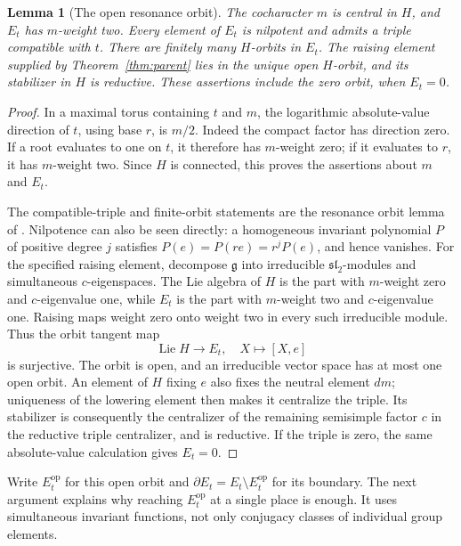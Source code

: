 \documentclass[11pt]{article}
\numberwithin{equation}{section}
\newtheorem{lemma}[theorem]{Lemma}
\theoremstyle{definition}
\theoremstyle{remark}
\newcommand{\g}{\mathfrak g}
\newcommand{\Lie}{\operatorname{Lie}}
\begin{document}
\begin{lemma}[The open resonance orbit]\label{lem:orbit-open}
The cocharacter $m$ is central in $H$, and $E_t$ has $m$-weight
two.  Every element of $E_t$ is nilpotent and admits a triple
compatible with $t$.  There are finitely many $H$-orbits in $E_t$.
The raising element supplied by Theorem~\ref{thm:parent} lies in
the unique open $H$-orbit, and its stabilizer in $H$ is reductive.
These assertions include the zero orbit, when $E_t=0$.
\end{lemma}

\begin{proof}
In a maximal torus containing $t$ and $m$, the logarithmic
absolute-value direction of $t$, using base $r$, is $m/2$.
Indeed the compact factor has direction zero.  If a root evaluates
to one on $t$, it therefore has $m$-weight zero; if it evaluates
to $r$, it has $m$-weight two.  Since $H$ is connected, this proves
the assertions about $m$ and $E_t$.

The compatible-triple and finite-orbit statements are the resonance
orbit lemma of \cite[Section~3, Lemma ``Resonance orbits'']{Parent}.
Nilpotence can also be seen directly: a homogeneous invariant
polynomial $P$ of positive degree $j$ satisfies
$P(e)=P(re)=r^jP(e)$, and hence vanishes.  For the specified raising
element, decompose $\g$ into irreducible $\mathfrak{sl}_2$-modules
and simultaneous $c$-eigenspaces.  The Lie algebra of $H$ is the
part with $m$-weight zero and $c$-eigenvalue one, while $E_t$ is
the part with $m$-weight two and $c$-eigenvalue one.  Raising maps
weight zero onto weight two in every such irreducible module.
Thus the orbit tangent map
\[
                   \Lie H\longrightarrow E_t,
                            \quad X\longmapsto[X,e]
\]
is surjective.  The orbit is open, and an irreducible vector space
has at most one open orbit.  An element of $H$ fixing $e$ also fixes
the neutral element $dm$; uniqueness of the lowering element then
makes it centralize the triple.  Its stabilizer is consequently the
centralizer of the remaining semisimple factor $c$ in the reductive
triple centralizer, and is reductive.  If the triple is zero, the
same absolute-value calculation gives $E_t=0$.
\end{proof}

Write $E_t^{\mathrm{op}}$ for this open orbit and
$\partial E_t=E_t\setminus E_t^{\mathrm{op}}$ for its boundary.
The next argument explains why reaching $E_t^{\mathrm{op}}$ at a
single place is enough.  It uses simultaneous invariant functions,
not only conjugacy classes of individual group elements.
\end{document}
